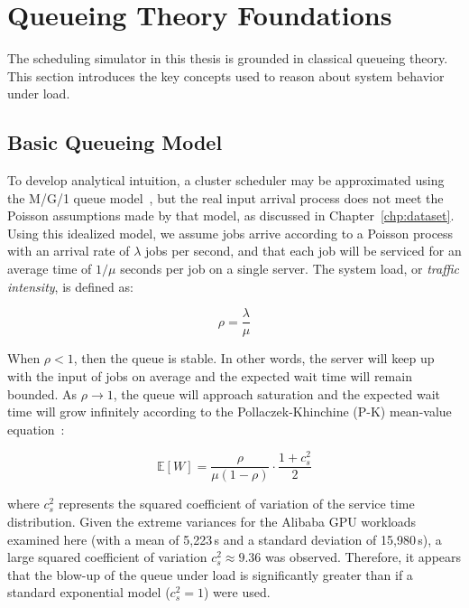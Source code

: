 \section{Queueing Theory Foundations}
\label{sec:queuetheory}

The scheduling simulator in this thesis is grounded in classical queueing theory. This section introduces the key concepts used to reason about system behavior under load.

\subsection{Basic Queueing Model}

To develop analytical intuition, a cluster scheduler may be approximated using the M/G/1 queue model~\cite{kleinrock1975queueing}, but the real input arrival process does not meet the Poisson assumptions made by that model, as discussed in Chapter~\ref{chp:dataset}. Using this idealized model, we assume jobs arrive according to a Poisson process with an arrival rate of $\lambda$ jobs per second, and that each job will be serviced for an average time of $1/\mu$ seconds per job on a single server. The system load, or \textit{traffic intensity}, is defined as:

\begin{equation}
\rho = \frac{\lambda}{\mu}
\label{eq:rho}
\end{equation}

When $\rho < 1$, then the queue is stable. In other words, the server will keep up with the input of jobs on average and the expected wait time will remain bounded. As $\rho \to 1$, the queue will approach saturation and the expected wait time will grow infinitely according to the Pollaczek-Khinchine (P-K) mean-value equation~\cite{kleinrock1975queueing}:

\begin{equation}
\mathbb{E}[W] = \frac{\rho}{\mu(1-\rho)} \cdot \frac{1 + c_s^2}{2}
\label{eq:pk}
\end{equation}

where $c_s^2$ represents the squared coefficient of variation of the service time distribution. Given the extreme variances for the Alibaba GPU workloads examined here (with a mean of 5,223\,s and a standard deviation of 15,980\,s), a large squared coefficient of variation $c_s^2 \approx 9.36$ was observed. Therefore, it appears that the blow-up of the queue under load is significantly greater than if a standard exponential model ($c_s^2 = 1$) were used.

